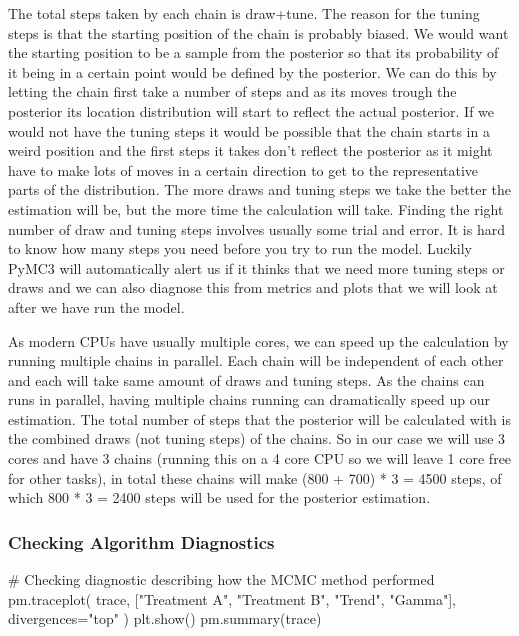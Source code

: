 \documentclass[12pt,a4paper,leqno]{report}
\theoremstyle{plain}
\theoremstyle{definition}
\theoremstyle{remark}
\begin{document}
The total steps taken by each chain is draw+tune. The reason for the tuning steps is
that the starting position of the chain is probably biased. We would want the starting
position to be a sample from the posterior so that its probability of it being in a certain
point would be defined by the posterior. We can do this by letting the chain first take
a number of steps and as its moves trough the posterior its location distribution will start to
reflect the actual posterior. If we would not have the tuning steps it would be possible
that the chain starts in a weird position and the first steps it takes don't reflect the
posterior as it might have to make lots of moves in a certain direction to get to the
representative parts of the distribution. The more draws and tuning steps we take the
better the estimation will be, but the more time the calculation will take. Finding the
right number of draw and tuning steps involves usually some trial and error. It is
hard to know how many steps you need before you try to run the model. Luckily PyMC3 will
automatically alert us if it thinks that we need more tuning steps or draws and we can
also diagnose this from metrics and plots that we will look at after we have run the
model.

As modern CPUs have usually multiple cores, we can speed up the calculation by running
multiple chains in parallel. Each chain will be independent of each other and each will
take same amount of draws and tuning steps. As the chains can runs in parallel, having
multiple chains running can dramatically speed up our estimation. The total number of steps that
the posterior will be calculated with is the combined draws (not tuning steps) of the
chains. So in our case we will use 3 cores and have 3 chains (running this on a 4 core
CPU so we will leave 1 core free for other tasks), in total these chains will make (800 +
700) * 3 = 4500 steps, of which 800 * 3 = 2400 steps will be used for the posterior estimation.

\subsubsection{Checking Algorithm Diagnostics}

\bigskip
\begin{pyverbatim}
# Checking diagnostic describing how the MCMC method performed
pm.traceplot(
        trace, ["Treatment A", "Treatment B", "Trend", "Gamma"], divergences="top"
    )
plt.show()
pm.summary(trace)
\end{pyverbatim}
\bigskip
\end{document}
